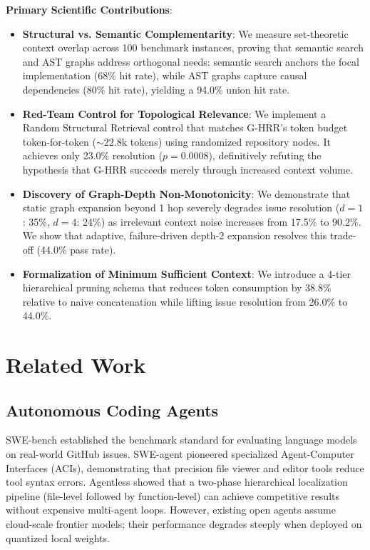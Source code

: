 \documentclass[10pt,twocolumn,letterpaper]{article}
\begin{document}
\textbf{Primary Scientific Contributions}:
\begin{itemize}
    \item \textbf{Structural vs. Semantic Complementarity}: We measure set-theoretic context overlap across 100 benchmark instances, proving that semantic search and AST graphs address orthogonal needs: semantic search anchors the focal implementation (68\% hit rate), while AST graphs capture causal dependencies (80\% hit rate), yielding a 94.0\% union hit rate.
    \item \textbf{Red-Team Control for Topological Relevance}: We implement a Random Structural Retrieval control that matches G-HRR's token budget token-for-token ($\sim 22.8$k tokens) using randomized repository nodes. It achieves only 23.0\% resolution ($p = 0.0008$), definitively refuting the hypothesis that G-HRR succeeds merely through increased context volume.
    \item \textbf{Discovery of Graph-Depth Non-Monotonicity}: We demonstrate that static graph expansion beyond 1 hop severely degrades issue resolution ($d=1$: 35\%, $d=4$: 24\%) as irrelevant context noise increases from 17.5\% to 90.2\%. We show that adaptive, failure-driven depth-2 expansion resolves this trade-off (44.0\% pass rate).
    \item \textbf{Formalization of Minimum Sufficient Context}: We introduce a 4-tier hierarchical pruning schema that reduces token consumption by 38.8\% relative to naive concatenation while lifting issue resolution from 26.0\% to 44.0\%.
\end{itemize}

\section{Related Work}
\subsection{Autonomous Coding Agents}
SWE-bench \cite{jimenez2024swebench} established the benchmark standard for evaluating language models on real-world GitHub issues. SWE-agent \cite{yang2024sweagent} pioneered specialized Agent-Computer Interfaces (ACIs), demonstrating that precision file viewer and editor tools reduce tool syntax errors. Agentless \cite{xia2024agentless} showed that a two-phase hierarchical localization pipeline (file-level followed by function-level) can achieve competitive results without expensive multi-agent loops. However, existing open agents assume cloud-scale frontier models; their performance degrades steeply when deployed on quantized local weights.
\end{document}
